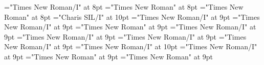 \documentclass[gps1,twoside]{article}
\begin{document}
\font\exampleexamplespansensespanspansubentrysubentriesentrysubentriesdiventryletData="Times New Roman/I" at 8pt
\font\examplebeforeexamplespansensespanspansubentrysubentriesentrysubentriesdiventryletData="Times New Roman" at 8pt
\font\exampleafterexamplespansensespanspansubentrysubentriesentrysubentriesdiventryletData="Times New Roman" at 8pt
\font\spanbzhexampleexamplespansensespanspansubentrysubentriesentrysubentriesdiventryletData="Charis SIL/I" at 10pt
\font\spanexampleexampleexamplessensesensessensesensessubentrysubentriesentrylastchildafterexampleexamplespansensespanspansubentrysubentriesentrysubentriesdiventryletData="Times New Roman/I" at 9pt
\font\spanexampleexampleexamplessensesensessensesensessubentrysubentriesentryexamplespansensespanspansubentrysubentriesentrysubentriesdiventryletData="Times New Roman/I" at 9pt
\font\spanexampleexampleexamplessensesensessensesensessubentrysubentriesentrylastchildafterexamplespansensespanspansubentrysubentriesentrysubentriesdiventryletData="Times New Roman" at 9pt
\font\translationspanexampleexampleexamplessensesensessensesensessubentrysubentriesentryexamplespansensespanspansubentrysubentriesentrysubentriesdiventryletData="Times New Roman/I" at 9pt
\font\translationafterspanexampleexampleexamplessensesensessensesensessubentrysubentriesentryexamplespansensespanspansubentrysubentriesentrysubentriesdiventryletData="Times New Roman/I" at 9pt
\font\translationtranslationspanexampleexampleexamplessensesensessensesensessubentrysubentriesentryexamplespansensespanspansubentrysubentriesentrysubentriesdiventryletData="Times New Roman/I" at 9pt
\font\translationaftertranslationspanexampleexampleexamplessensesensessensesensessubentrysubentriesentryexamplespansensespanspansubentrysubentriesentrysubentriesdiventryletData="Times New Roman/I" at 9pt
\font\spanentranslationtranslationspanexampleexampleexamplessensesensessensesensessubentrysubentriesentryexamplespansensespanspansubentrysubentriesentrysubentriesdiventryletData="Times New Roman/I" at 10pt
\font\spantranslationtranslationtranslationsexampleexamplessensesensessensesensessubentrysubentriesentrylastchildaftertranslationtranslationspanexampleexampleexamplessensesensessensesensessubentrysubentriesentryexamplespansensespanspansubentrysubentriesentrysubentriesdiventryletData="Times New Roman/I" at 9pt
\font\semanticdomainssensesensessubentrysubentriesentrybeforesensespanspansubentrysubentriesentrysubentriesdiventryletData="Times New Roman" at 9pt
\font\semanticdomainssensesensessubentrysubentriesentryaftersensespanspansubentrysubentriesentrysubentriesdiventryletData="Times New Roman" at 9pt
\end{document}
